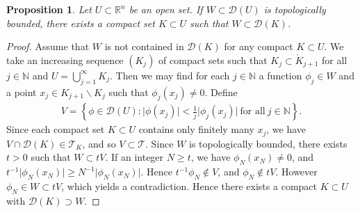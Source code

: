 \documentclass{article}
\numberwithin{equation}{section}
\newcommand{\bbN}{\mathbb{N}}
\newcommand{\bbR}{\mathbb{R}}
\renewcommand{\cal}{\mathcal}
\theoremstyle{plain}
\newtheorem{proposition}[theorem]{Proposition}
\theoremstyle{definition}
\begin{document}
\begin{proposition}\label{topoboundcmpact}
Let $U\subset\bbR^n$ be an open set. If $W\subset\cal{D}(U)$ is topologically bounded, there exists a compact set $K\subset U$ such that $W\subset\cal{D}(K)$.
\end{proposition}
\begin{proof}
Assume that $W$ is not contained in $\cal{D}(K)$ for any compact $K\subset U$. We take an increasing sequence $(K_j)$ of compact sets such that $K_j\subset\mathring{K}_{j+1}$ for all $j\in\bbN$ and $U=\bigcup_{j=1}^\infty K_j$. Then we may find for each $j\in\bbN$ a function $\phi_j\in W$ and a point $x_j\in K_{j+1}\backslash K_j$ such that $\phi_j(x_j)\neq 0$. Define
\begin{align*}
	V=\left\{\phi\in\cal{D}(U):\vert\phi(x_j)\vert<\frac{1}{j}\vert\phi_j(x_j)\vert\ \text{for all}\ j\in\bbN\right\}.
\end{align*}
Since each compact set $K\subset U$ contains only finitely many $x_j$, we have $V\cap\cal{D}(K)\in\mathscr{T}_K$, and so $V\subset\mathscr{T}$. Since $W$ is topologically bounded, there exists $t>0$ such that $W\subset tV$. If an integer $N\geq t$, we have $\phi_N(x_N)\neq 0$, and $t^{-1}\vert\phi_N(x_N)\vert\geq N^{-1}\vert\phi_N(x_N)\vert$. Hence $t^{-1}\phi_N\notin V$, and $\phi_N\notin tV$. However $\phi_N\in W\subset tV$, which yields a contradiction. Hence there exists a compact $K\subset U$ with $\cal{D}(K)\supset W$.
\end{proof}
\end{document}

